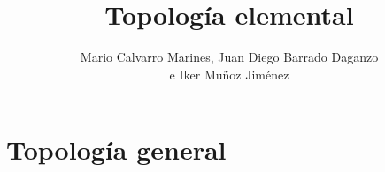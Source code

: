 \documentclass[10pt,a4paper,openright]{book}
\title{\Huge Topología elemental}
\author{Mario Calvarro Marines, Juan Diego Barrado Daganzo  \\
e Iker Muñoz Jiménez}
\date{}
\begin{document}
\frontmatter
\maketitle
\setcounter{tocdepth}{3}%
\tableofcontents


\mainmatter
\part{Topología general}









%
%
%
%
%
%
\end{document}
